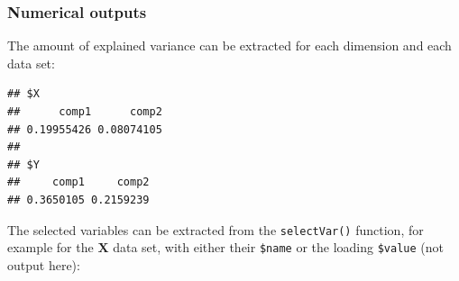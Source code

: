 \documentclass[]{book}
\newenvironment{Shaded}{\begin{snugshade}}{\end{snugshade}}
\newcommand{\KeywordTok}[1]{\textcolor[rgb]{0.13,0.29,0.53}{\textbf{#1}}}
\newcommand{\DataTypeTok}[1]{\textcolor[rgb]{0.13,0.29,0.53}{#1}}
\newcommand{\DecValTok}[1]{\textcolor[rgb]{0.00,0.00,0.81}{#1}}
\newcommand{\StringTok}[1]{\textcolor[rgb]{0.31,0.60,0.02}{#1}}
\newcommand{\CommentTok}[1]{\textcolor[rgb]{0.56,0.35,0.01}{\textit{#1}}}
\newcommand{\OperatorTok}[1]{\textcolor[rgb]{0.81,0.36,0.00}{\textbf{#1}}}
\newcommand{\NormalTok}[1]{#1}
\begin{document}
\begin{Shaded}
\end{Shaded}

\subsubsection{Numerical outputs}\label{pls:result:num}

The amount of explained variance can be extracted for each dimension and
each data set:

\begin{Shaded}
\end{Shaded}

\begin{verbatim}
## $X
##      comp1      comp2 
## 0.19955426 0.08074105 
## 
## $Y
##     comp1     comp2 
## 0.3650105 0.2159239
\end{verbatim}

The selected variables can be extracted from the \texttt{selectVar()}
function, for example for the \(\boldsymbol X\) data set, with either
their \texttt{\$name} or the loading \texttt{\$value} (not output here):

\begin{Shaded}
\end{Shaded}
\end{document}
